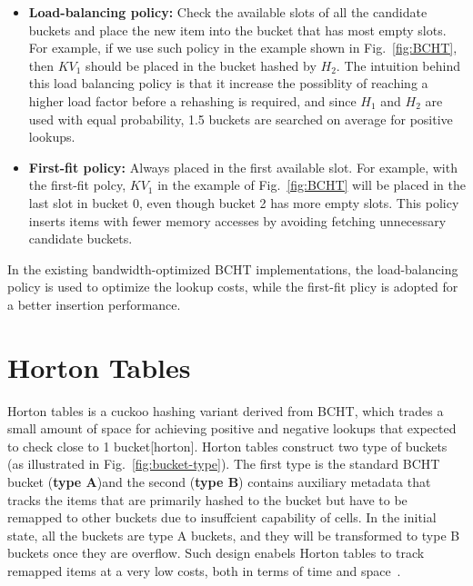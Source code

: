 \documentclass[12pt,conference,compsoc]{IEEEtran}
\begin{document}
\begin{itemize}
    \item \textbf{Load-balancing policy:} Check the available slots of all the candidate buckets and place the new item into the bucket that has most empty slots. For example, if we use such policy in the example shown in Fig.~\ref{fig:BCHT}, then $KV_1$ should be placed in the bucket hashed by $H_2$. The intuition behind this load balancing policy is that it increase the possiblity of reaching a higher load factor before a rehashing is required, and since $H_1$ and $H_2$ are used with equal probability, 1.5 buckets are searched on average for positive lookups.
    \item \textbf{First-fit policy:} Always placed in the first available slot. For example, with the first-fit polcy, $KV_1$ in the example of Fig.~\ref{fig:BCHT} will be placed in the last slot in bucket 0, even though bucket 2 has more empty slots. This policy inserts items with fewer memory accesses by avoiding fetching unnecessary candidate buckets.
\end{itemize}

In the existing bandwidth-optimized BCHT implementations, the load-balancing policy is used to optimize the lookup costs, while the first-fit plicy is adopted for a better insertion performance.

\section{Horton Tables}
\label{sec:horton}
Horton tables is a cuckoo hashing variant derived from BCHT, which trades a small amount of space for achieving positive and negative lookups that expected to check close to 1 bucket[horton]. Horton tables construct two type of buckets (as illustrated in Fig.~\ref{fig:bucket-type}). The first type is the standard BCHT bucket (\textbf{type A})and the second (\textbf{type B}) contains auxiliary metadata that tracks the items that are primarily hashed to the bucket but have to be remapped to other buckets due to insuffcient capability of cells. In the initial state, all the buckets are type A buckets, and they will be transformed to type B buckets once they are overflow. Such design enabels Horton tables to track remapped items at a very low costs, both in terms of time and space~\cite{Horton}.
\end{document}
